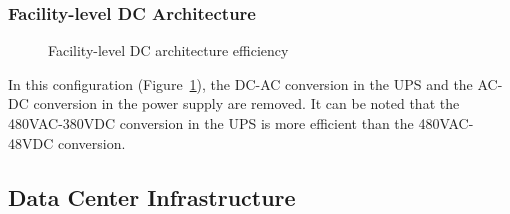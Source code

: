             \subsubsection*{Facility-level DC Architecture}
                \begin{figure}[h!tb]
                    \centering
                    \caption{Facility-level DC architecture efficiency}
                    \label{fig:facility_level_dc_efficiency}
                \end{figure}
                In this configuration (Figure~\ref{fig:facility_level_dc_efficiency}), the DC-AC conversion in the UPS and the AC-DC conversion in the power supply are removed. It can be noted that the 480VAC-380VDC conversion in the UPS is more efficient than the 480VAC-48VDC conversion.
            
        \subsection{Data Center Infrastructure} \label{sec2:data_center_infrastructure}
